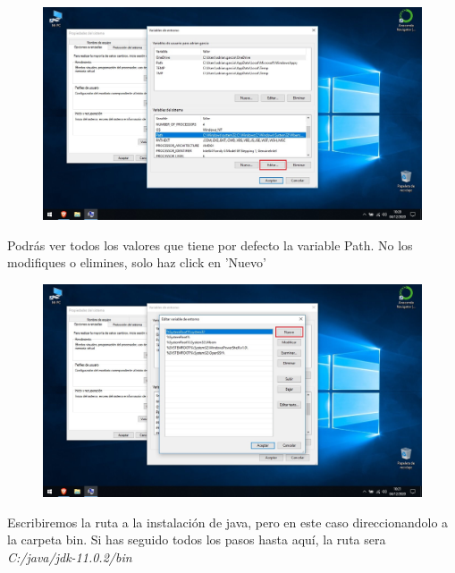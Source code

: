 \documentclass[a4paper,10pt]{article}
\begin{document}
\begin{figure}[H]
\begin{center}
\includegraphics[width=500pt]{./fotos/introduccion/12 - Java (V).jpg}
\end{center}
\end{figure}

\clearpage

Podrás ver todos los valores que tiene por defecto la variable Path. No los modifiques o elimines, solo haz click en 'Nuevo' 

\begin{figure}[H]
\begin{center}
\includegraphics[width=500pt]{./fotos/introduccion/13 - Java (V).jpg}
\end{center}
\end{figure}

Escribiremos la ruta a la instalación de java, pero en este caso direccionandolo a la carpeta bin. Si has seguido todos los pasos hasta aquí, la ruta sera \textit{C:/java/jdk-11.0.2/bin}
\end{document}
